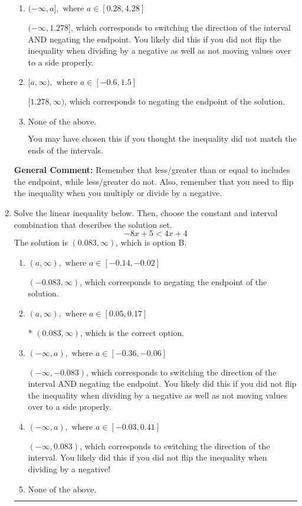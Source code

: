 \documentclass{extbook}[14pt]
\newcommand{\litem}[1]{\item #1

\rule{\textwidth}{0.4pt}}
\begin{document}
\begin{enumerate}
{\begin{enumerate}[label=\Alph*.]
* $[-1.278, \infty)$, which is the correct option.
\item \( (-\infty, a], \text{ where } a \in [0.28, 4.28] \)

 $(-\infty, 1.278]$, which corresponds to switching the direction of the interval AND negating the endpoint. You likely did this if you did not flip the inequality when dividing by a negative as well as not moving values over to a side properly.
\item \( [a, \infty), \text{ where } a \in [-0.6, 1.5] \)

 $[1.278, \infty)$, which corresponds to negating the endpoint of the solution.
\item \( \text{None of the above}. \)

You may have chosen this if you thought the inequality did not match the ends of the intervals.
\end{enumerate}

\textbf{General Comment:} Remember that less/greater than or equal to includes the endpoint, while less/greater do not. Also, remember that you need to flip the inequality when you multiply or divide by a negative.
}
\litem{
Solve the linear inequality below. Then, choose the constant and interval combination that describes the solution set.
\[ -8x + 5 < 4x + 4 \]
The solution is \( (0.083, \infty) \), which is option B.\begin{enumerate}[label=\Alph*.]
\item \( (a, \infty), \text{ where } a \in [-0.14, -0.02] \)

 $(-0.083, \infty)$, which corresponds to negating the endpoint of the solution.
\item \( (a, \infty), \text{ where } a \in [0.05, 0.17] \)

* $(0.083, \infty)$, which is the correct option.
\item \( (-\infty, a), \text{ where } a \in [-0.36, -0.06] \)

 $(-\infty, -0.083)$, which corresponds to switching the direction of the interval AND negating the endpoint. You likely did this if you did not flip the inequality when dividing by a negative as well as not moving values over to a side properly.
\item \( (-\infty, a), \text{ where } a \in [-0.03, 0.41] \)

 $(-\infty, 0.083)$, which corresponds to switching the direction of the interval. You likely did this if you did not flip the inequality when dividing by a negative!
\item \( \text{None of the above}. \)


\end{enumerate}}
\end{enumerate}
\end{document}
